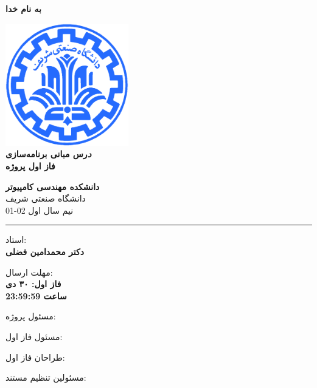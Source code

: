 \documentclass[]{article}
\begin{document}
\begin{titlepage}
\begin{center}

\textbf{ \Huge{به نام خدا} }
        
\vspace{0.2cm}

\includegraphics[width=0.4\textwidth]{sharif1.png}\\
\vspace{0.2cm}
\textbf{ \Huge{\emph درس مبانی برنامه‌سازی} }\\
\vspace{0.25cm}
\textbf{ \Large{ فاز اول پروژه} }
\vspace{0.2cm}
       
 
      \large \textbf{دانشکده مهندسی کامپیوتر}\\\vspace{0.1cm}
    \large   دانشگاه صنعتی شریف\\\vspace{0.2cm}
       \large   ﻧﯿﻢ سال اول 02-01 \\\vspace{0.10cm}
      \noindent\rule[1ex]{\linewidth}{1pt}
استاد:\\
    \textbf{{دکتر محمدامین فضلی}}



    \vspace{0.20cm}

   مهلت ارسال:\\
    \textbf{{فاز اول: ۳۰ دی}}\\
    \textbf{{ساعت 23:59:59}}

    \vspace{0.10cm}
مسئول پروژه:\\
    \textbf{}
    
        \vspace{0.10cm}
مسئول فاز اول:\\
    \textbf{}
    
        \vspace{0.10cm}
طراحان فاز اول:\\
    \textbf{}
    
        \vspace{0.05cm}
مسئولین تنظیم مستند:\\
    \textbf{}
    

\end{center}
\end{titlepage}
\end{document}
